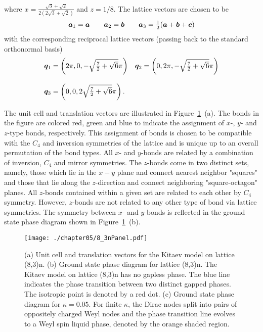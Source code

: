 %
where $x = \frac{\sqrt{3} + \sqrt{2}}{2(2\sqrt{3} + \sqrt{2})}$ and $z=1/8$.
The lattice vectors are chosen to be
%
\begin{equation}
	\begin{matrix*}[l]
		\ba_1 = \ba \qquad
		\ba_2 = \bb \qquad
		\ba_3 = \frac{1}{2}(\ba + \bb + \bc)
	\end{matrix*}
\end{equation}
%
with the corresponding reciprocal lattice vectors (passing back to the standard orthonormal basis)
%
\begin{equation}
	\begin{matrix*}[l]
		\bq_1 = \left(2\pi, 0, -\sqrt{\frac{7}{2} + \sqrt{6}}\pi\right) &
		\bq_2 = \left(0, 2\pi, -\sqrt{\frac{7}{2} + \sqrt{6}}\pi\right) \\
		&\\
		\bq_3 = \left(0, 0, 2\sqrt{\frac{7}{2} + \sqrt{6}}\pi\right). &
	\end{matrix*}
\end{equation}
%

The unit cell and translation vectors are illustrated in Figure~\ref{fig:chapter05_8_3nPanel}~(a).
The bonds in the figure are colored red, green and blue to indicate the assignment of $x$-, $y$- and $z$-type bonds, respectively.
This assignment of bonds is chosen to be compatible with the $C_4$ and inversion symmetries of the lattice and is unique up to an overall permutation of the bond types.
All $x$- and $y$-bonds are related by a combination of inversion, $C_4$ and mirror symmetries.
The $z$-bonds come in two distinct sets, namely, those which lie in the $x-y$ plane and connect nearest neighbor "squares" and those that lie along the $z$-direction and connect neighboring "square-octagon" planes.
All $z$-bonds contained within a given set are related to each other by $C_4$ symmetry.
However, $z$-bonds are not related to any other type of bond via lattice symmetries.
The symmetry between $x$- and $y$-bonds is reflected in the ground state phase diagram shown in Figure~\ref{fig:chapter05_8_3nPanel}~(b).
%
\begin{figure}[tb]
	\centering
	\texttt{[image: ./chapter05/8\_3nPanel.pdf]}
	\caption{
		(a) Unit cell and translation vectors for the Kitaev model on lattice (8,3)n.
		(b) Ground state phase diagram for lattice (8,3)n.
		The Kitaev model on lattice (8,3)n has no gapless phase.
		The blue line indicates the phase transition between two distinct gapped phases.
		The isotropic point is denoted by a red dot.
		(c) Ground state phase diagram for $\kappa = 0.05$.
		For finite $\kappa$, the Dirac nodes split into pairs of oppositely charged Weyl nodes and the phase transition line evolves to a Weyl spin liquid phase, denoted by the orange shaded region.
	}
	\label{fig:chapter05_8_3nPanel}
\end{figure}
%


